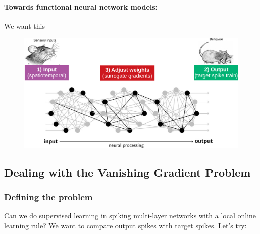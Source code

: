 \documentclass[main]{subfiles}
\begin{document}
\paragraph{Towards functional neural network models: }
We want this
\begin{figure}[H]
    \centering
    \includegraphics[width=0.8\linewidth]{10_DeepLearningWithSpikes/figures/towards_functional_nn.png}
    \caption{}
    \label{fig:my_label}
\end{figure}

\subsection{Dealing with the Vanishing Gradient Problem}

\subsubsection{Defining the problem}
Can we do supervised learning in spiking multi-layer networks with a local online learning rule? We want to compare output spikes with target spikes. Let's try:
\end{document}
